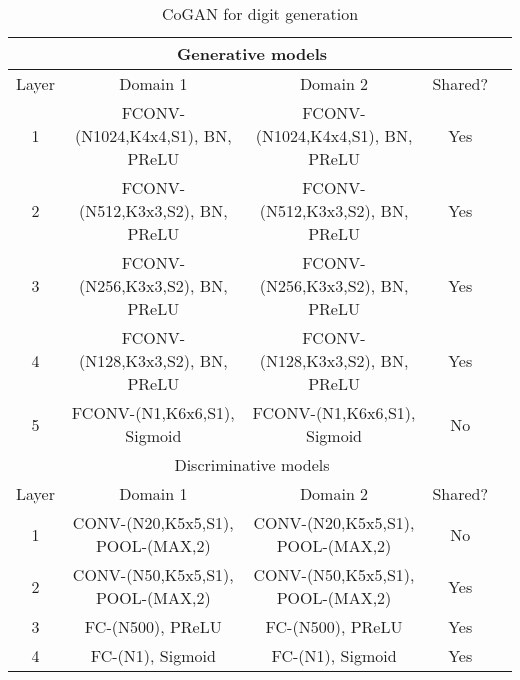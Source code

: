 \begin{table*}[thb!]
\small
\centering
{
\caption{CoGAN for digit generation}
\label{tbl::mnist_g}
\begin{tabular}{|c|c|c|c|c|}
\hline
\multicolumn{4}{|c|}{Generative models}\\
\hline\rule{0pt}{2ex}    
Layer &  Domain 1 & Domain 2 & Shared? \\
\hline 
1 &  FCONV-(N1024,K4x4,S1), BN, PReLU & FCONV-(N1024,K4x4,S1), BN, PReLU & Yes\\
2 &  FCONV-(N512,K3x3,S2), BN, PReLU & FCONV-(N512,K3x3,S2), BN, PReLU &Yes\\
3 &  FCONV-(N256,K3x3,S2), BN, PReLU & FCONV-(N256,K3x3,S2), BN, PReLU &Yes\\
4 &  FCONV-(N128,K3x3,S2), BN, PReLU & FCONV-(N128,K3x3,S2), BN, PReLU &Yes\\
5 &  FCONV-(N1,K6x6,S1), Sigmoid & FCONV-(N1,K6x6,S1), Sigmoid & No\\
\hline
\hline
\multicolumn{4}{|c|}{Discriminative models}\\
\hline\rule{0pt}{2ex} 
Layer &  Domain 1 & Domain 2 & Shared? \\
\hline
1 & CONV-(N20,K5x5,S1), POOL-(MAX,2) & CONV-(N20,K5x5,S1), POOL-(MAX,2) &No\\
2 & CONV-(N50,K5x5,S1), POOL-(MAX,2) & CONV-(N50,K5x5,S1), POOL-(MAX,2) &Yes\\
3 & FC-(N500), PReLU & FC-(N500), PReLU &Yes\\
4 & FC-(N1), Sigmoid & FC-(N1), Sigmoid &Yes\\
\hline
\end{tabular}
}
\end{table*}


